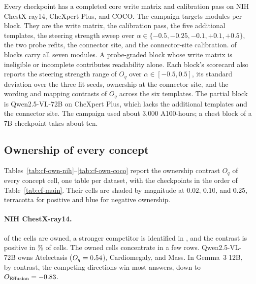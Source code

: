 \documentclass[11pt]{article}
\begin{document}
Every checkpoint has a completed core write matrix and calibration pass on NIH ChestX-ray14, CheXpert Plus, and COCO. The campaign targets \cfCoveragePlannedWord{} modules per block. They are the write matrix, the calibration pass, the five additional templates, the steering strength sweep over $\alpha\in\{-0.5,-0.25,-0.1,+0.1,+0.5\}$, the two probe refits, the connector site, and the connector-site calibration. \cfCoverageBlocksAllSeven{} of \cfBlocks{} blocks carry all seven modules. A probe-graded block whose write matrix is ineligible or incomplete contributes readability alone. Each block's scorecard also reports the steering strength range of $O_q$ over $\alpha\in[-0.5,0.5]$, its standard deviation over the three fit seeds, ownership at the connector site, and the wording and mapping contrasts of $O_q$ across the six templates. The partial block is Qwen2.5-VL-72B on CheXpert Plus, which lacks the additional templates and the connector site. The campaign used about 3,000 A100-hours; a chest block of a 7B checkpoint takes about ten.


\subsection{Ownership of every concept}
\label{app:cf-tables}

Tables~\ref{tab:cf-own-nih}--\ref{tab:cf-own-coco} report the ownership contrast $O_q$ of every concept cell, one table per dataset, with the checkpoints in the order of Table~\ref{tab:cf-main}. Their cells are shaded by magnitude at $0.02$, $0.10$, and $0.25$, terracotta for positive and blue for negative ownership.

\paragraph{NIH ChestX-ray14.} \cfNihOwned{} of the \cfNihCells{} cells are owned, a stronger competitor is identified in \cfNihCompetitor{}, and the contrast is positive in \cfGeoOwnWinsNihPct\% of cells. The owned cells concentrate in a few rows. Qwen2.5-VL-72B owns Atelectasis ($O_q=0.54$), Cardiomegaly, and Mass. In Gemma~3 12B, by contrast, the competing directions win most answers, down to $O_{\mathrm{Effusion}}=-0.83$.
\end{document}
